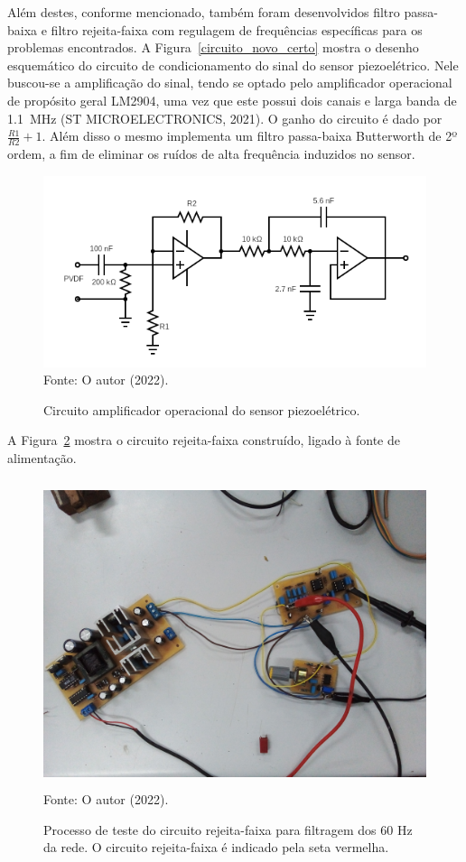 \documentclass[
	12pt,				
	oneside,			
	a4paper,			
	english,			
	brazil,			
	]{abntex2ppgsi}
\begin{document}
Além destes, conforme mencionado, também foram desenvolvidos filtro passa-baixa e filtro rejeita-faixa com regulagem de frequências específicas para os problemas encontrados. A Figura~\ref{circuito_novo_certo} mostra o desenho esquemático do circuito de condicionamento do sinal do sensor piezoelétrico. Nele buscou-se a amplificação do sinal, tendo se optado pelo amplificador operacional de propósito geral LM2904, uma vez que este possui dois canais e larga banda de \SI{1.1}{\mega\hertz} (ST MICROELECTRONICS, 2021). O ganho do circuito é dado por $ \frac{R1}{R2} + 1$. Além disso o mesmo implementa um filtro passa-baixa Butterworth de 2º ordem, a fim de eliminar os ruídos de alta frequência induzidos no sensor.  

\begin{figure}[H]
\centering
\caption {Circuito amplificador operacional do sensor piezoelétrico.}
\includegraphics[width=\textwidth,height=\textheight,keepaspectratio]{circuito_novo_certo} \\
Fonte: O autor (2022).
\label{circuito_novo}
\end{figure} 

A Figura~\ref{circuito_rejeita_faixa} mostra o circuito rejeita-faixa construído, ligado à fonte de alimentação. 

\begin{figure}[H]
\centering
\caption {Processo de teste do circuito rejeita-faixa para filtragem dos 60 Hz da rede. O circuito rejeita-faixa é indicado pela seta vermelha.}
\includegraphics[width=\textwidth,height=90mm,keepaspectratio]{circuito_rejeita_faixa} \\
Fonte: O autor (2022).
\label{circuito_rejeita_faixa}
\end{figure} 
\end{document}
